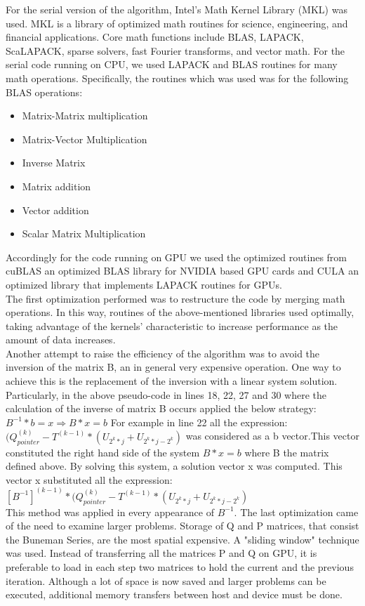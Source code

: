 For the serial version of the algorithm, Intel's Math Kernel Library (MKL) was used.  MKL is a library of optimized math routines for science, engineering, and financial applications. Core math functions include BLAS, LAPACK, ScaLAPACK, sparse solvers, fast Fourier transforms, and vector math.
For the serial code running on CPU, we used LAPACK and BLAS routines for many math operations. Specifically, the routines which was used was for the following BLAS operations:
\begin{itemize}
  \item Matrix-Matrix multiplication 
  \item Matrix-Vector Multiplication
  \item Inverse Matrix
  \item Matrix addition
  \item Vector addition 
  \item Scalar Matrix Multiplication
\end{itemize}

Accordingly for the code running on GPU we used the optimized routines from cuBLAS an optimized BLAS library for NVIDIA based GPU cards and CULA an optimized library that implements LAPACK routines for GPUs.\\
The first optimization performed was to restructure the code by merging math operations. In this way, routines of the above-mentioned libraries used optimally, taking advantage of the kernels' characteristic to increase performance as the amount of data increases. \\

Another attempt to raise the efficiency of the algorithm was to avoid the inversion of the matrix B, an in general very expensive operation. One way to achieve this is the replacement of the inversion with a linear system solution.
Particularly, in the above pseudo-code in lines 18, 22, 27 and 30 where the calculation of 
the inverse of matrix B occurs applied the below strategy:\\

$B^{-1}*b = x \Longrightarrow B*x = b$\newpage
For example in line 22 all the expression: $(Q_{pointer}^{(k)}-T^{(k-1)}*(U_{2^{k}*j}+U_{2^{k}*j-2^{k}})$ was considered as a b vector.This vector constituted the right hand side of the system $B*x = b$ where B the matrix defined above. By solving this system, a solution vector x was computed. This vector x substituted all the expression:\\
$[B^{-1}]^{(k-1)}*(Q_{pointer}^{(k)}-T^{(k-1)}*(U_{2^{k}*j}+U_{2^{k}*j-2^{k}})$\\
This method was applied in every appearance of $B^{-1}$.
The last optimization came of the need to examine larger problems. Storage of Q and P matrices, that consist the Buneman Series, are the most spatial expensive. A "sliding window" technique was used. Instead of transferring all the matrices P and Q on GPU, it is preferable to load in each step two matrices to hold the current and the previous iteration. Although a lot of space is now saved and larger problems can be executed, additional memory transfers between host and device must be done.\\

